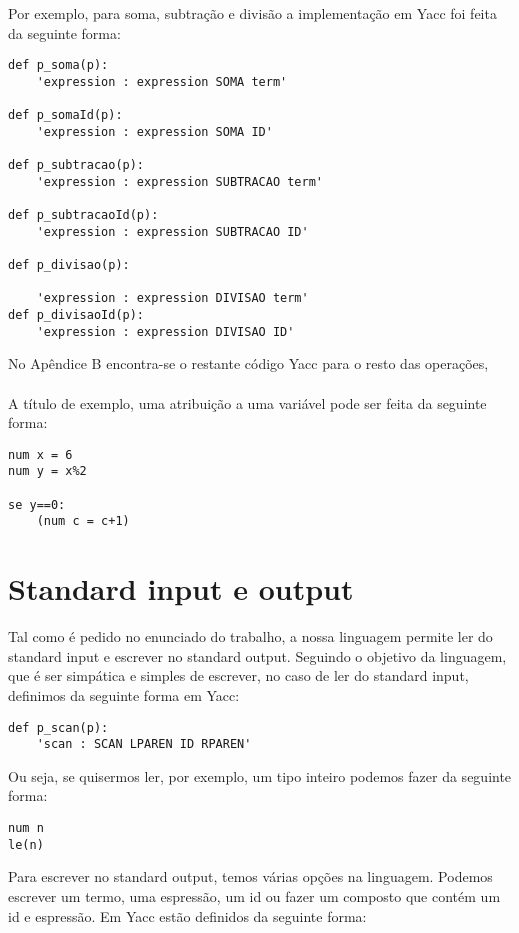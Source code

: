 \documentclass[11pt,a4paper]{report}%
\begin{document}
Por exemplo, para soma, subtração e divisão a implementação em Yacc foi feita da seguinte forma:

\begin{verbatim}
def p_soma(p):
    'expression : expression SOMA term'
    
def p_somaId(p): 
    'expression : expression SOMA ID'
    
def p_subtracao(p):
    'expression : expression SUBTRACAO term'
    
def p_subtracaoId(p): 
    'expression : expression SUBTRACAO ID'
    
def p_divisao(p):

    'expression : expression DIVISAO term'
def p_divisaoId(p): 
    'expression : expression DIVISAO ID'
\end{verbatim}

No Apêndice B encontra-se o restante código Yacc para o resto das operações,
\\
\\
A título de exemplo, uma atribuição a uma variável pode ser feita da seguinte forma:
\\
\begin{lstlisting}[frame=single,numbers=none]
num x = 6
num y = x%2

se y==0:
    (num c = c+1)
\end{lstlisting}

\newpage

\section{Standard input e output}

Tal como é pedido no enunciado do trabalho, a nossa linguagem permite ler do standard input e escrever no standard output. Seguindo o objetivo da linguagem, que é ser simpática e simples de escrever, no caso de ler do standard input, definimos da seguinte forma em Yacc:

\begin{verbatim}
def p_scan(p): 
    'scan : SCAN LPAREN ID RPAREN'
\end{verbatim}

Ou seja, se quisermos ler, por exemplo, um tipo inteiro podemos fazer da seguinte forma:

\begin{lstlisting}[frame=single,numbers=none]
num n 
le(n)
\end{lstlisting}

Para escrever no standard output, temos várias opções na linguagem. Podemos escrever um termo, uma espressão, um id ou fazer um composto que contém um id e espressão. Em Yacc estão definidos da seguinte forma:
\end{document}
